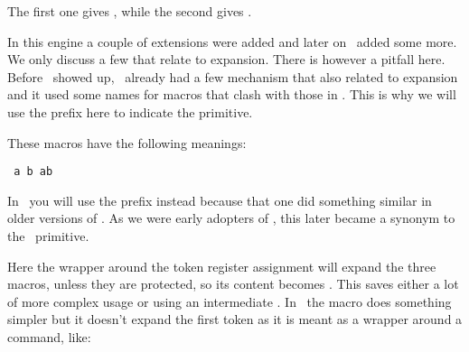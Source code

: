 \typebuffer[b][option=TEX]

The first one gives \inlinebuffer[a], while the second gives \inlinebuffer[b].


\stopsection

\startsection[title={\ETEX\ primitives}]

In this engine a couple of extensions were added and later on \PDFTEX\ added some
more. We only discuss a few that relate to expansion. There is however a pitfall
here. Before \ETEX\ showed up, \CONTEXT\ already had a few mechanism that also
related to expansion and it used some names for macros that clash with those in
\ETEX. This is why we will use the \type {\normal} prefix here to indicate the
primitive.

\startbuffer
\def\MyMacroA{a}
\def\MyMacroB{b}
\normalprotected{}
\edef\MyMacroABC{\MyMacroA\MyMacroB\MyMacroC}
\stopbuffer

\typebuffer[option=TEX] \getbuffer

These macros have the following meanings:

\startlines \tt
\meaning\MyMacroA
\meaning\MyMacroB
\meaning\MyMacroC
\meaning\MyMacroABC
\stoplines

In \CONTEXT\ you will use the \type {\unexpanded} prefix instead because that one
did something similar in older versions of \CONTEXT. As we were early adopters of
\ETEX, this later became a synonym to the \ETEX\ primitive.

\startbuffer
\def\MyMacroA{a}
\def\MyMacroB{b}
\normalprotected{}
\normalexpanded{\scratchtoks{\MyMacroA\MyMacroB\MyMacroC}}
\stopbuffer

\typebuffer[option=TEX] \getbuffer

Here the wrapper around the token register assignment will expand the three
macros, unless they are protected, so its content becomes \MyShow. This saves
either a lot of more complex \type {\expandafter} usage or using an intermediate
\type {\edef}. In \CONTEXT\ the \type {\expanded} macro does something simpler
but it doesn't expand the first token as it is meant as a wrapper around a command,
like:

\starttyping[option=TEX]
\stoptyping


